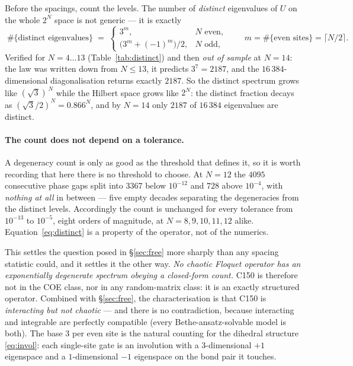 \documentclass[11pt]{article}
\theoremstyle{plain}
\theoremstyle{definition}
\begin{document}
Before the spacings, count the levels. The number of \emph{distinct} eigenvalues
of $U$ on the whole $2^N$ space is not generic --- it is exactly
\begin{equation}
  \boxed{\;\#\{\text{distinct eigenvalues}\} \;=\;
  \begin{cases}
    3^{m}, & N \text{ even},\\[2pt]
    \bigl(3^{m} + (-1)^{m}\bigr)/2, & N \text{ odd},
  \end{cases}
  \qquad m = \#\{\text{even sites}\} = \lceil N/2\rceil . \;}
  \label{eq:distinct}
\end{equation}
Verified for $N=4\ldots13$ (Table~\ref{tab:distinct}) and then \emph{out of
sample} at $N=14$: the law was written down from $N\le13$, it predicts
$3^7 = 2187$, and the $16\,384$-dimensional diagonalisation returns exactly
$2187$. So the distinct spectrum grows like
$(\sqrt3)^{\,N}$ while the Hilbert space grows like $2^N$: the distinct fraction
decays as $(\sqrt3/2)^N = 0.866^N$, and by $N=14$ only $2187$ of $16\,384$
eigenvalues are distinct.

\paragraph{The count does not depend on a tolerance.} A degeneracy count is only
as good as the threshold that defines it, so it is worth recording that here
there is no threshold to choose. At $N=12$ the $4095$ consecutive phase gaps
split into $3367$ below $10^{-12}$ and $728$ above $10^{-4}$, with
\emph{nothing at all} in between --- five empty decades separating the
degeneracies from the distinct levels. Accordingly the count is unchanged for
every tolerance from $10^{-13}$ to $10^{-5}$, eight orders of magnitude, at
$N=8,9,10,11,12$ alike. Equation~\eqref{eq:distinct} is a property of the
operator, not of the numerics.

This settles the question posed in \S\ref{sec:free} more sharply than any
spacing statistic could, and it settles it the other way. \emph{No chaotic
Floquet operator has an exponentially degenerate spectrum obeying a closed-form
count.} C150 is therefore not in the COE class, nor in any random-matrix class:
it is an exactly structured operator. Combined with \S\ref{sec:free}, the
characterisation is that C150 is \emph{interacting but not chaotic} --- and there
is no contradiction, because interacting and integrable are perfectly
compatible (every Bethe-ansatz-solvable model is both). The base $3$ per even
site is the natural counting for the dihedral structure \eqref{eq:invol}: each
single-site gate is an involution with a $3$-dimensional $+1$ eigenspace and a
$1$-dimensional $-1$ eigenspace on the bond pair it touches.
\end{document}

